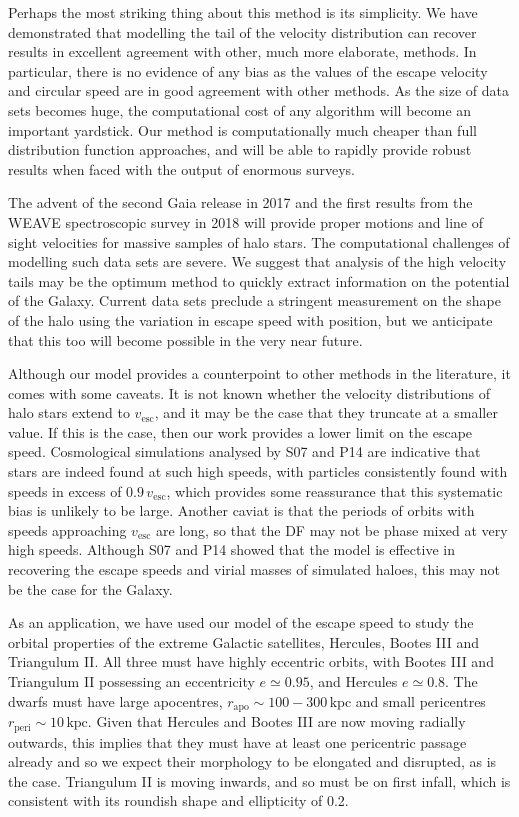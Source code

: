 \documentclass[useAMS,twocolumn,usenatbib]{mn2e}
\def\kpc{{\,\mathrm{kpc}}}
\def\vesc{{v_\mathrm{esc}}}
\def\rp{{r_\mathrm{peri}}}
\def\ra{{r_\mathrm{apo}}}
\begin{document}
Perhaps the most striking thing about this method is its simplicity. 
We have demonstrated that modelling the tail of the velocity distribution can recover results in excellent agreement with other, much more elaborate, methods. 
In particular, there is no evidence of any bias as the values of the escape velocity and circular speed are in good agreement with other methods.  
As the size of data sets becomes huge, the computational cost of any algorithm will become an important yardstick. 
Our method is computationally much cheaper than full distribution function approaches, and will be able to rapidly provide robust results when faced with the output of enormous surveys.

The advent of the second Gaia release in 2017 and the first results from the WEAVE spectroscopic survey in 2018 will provide proper motions and line of sight velocities for massive samples of halo stars. 
The computational challenges of modelling such data sets are severe. 
We suggest that analysis of the high velocity tails may be the optimum method to quickly extract information on the potential of the Galaxy.  
Current data sets preclude a stringent measurement on the shape of the halo using the variation in escape speed with position, but we anticipate that this too will become possible in the very near future.

Although our model provides a counterpoint to other methods in the literature, it comes with some caveats.
It is not known whether the velocity distributions of halo stars extend to $\vesc$, and it may be the case that they truncate at a smaller value.
If this is the case, then our work provides a lower limit on the escape speed.
Cosmological simulations analysed by S07 and P14 are indicative that stars are indeed found at such high speeds, with particles consistently found with speeds in excess of $0.9\,\vesc$, which provides some reassurance that this systematic bias is unlikely to be large.
Another caviat is that the periods of orbits with speeds approaching $\vesc$ are long, so that the DF may not be phase mixed at very high speeds. 
Although S07 and P14 showed that the model is effective in recovering the escape speeds and virial masses of simulated haloes, this may not be the case for the Galaxy.  

As an application, we have used our model of the escape speed to study the orbital properties of the extreme Galactic satellites, Hercules, Bootes III and Triangulum II. 
All three must have highly eccentric orbits, with Bootes III and Triangulum II possessing an eccentricity $e \simeq 0.95$, and Hercules
$e \simeq 0.8$. 
The dwarfs must have large apocentres, $\ra \sim 100 - 300\kpc$ and small pericentres $\rp \sim 10\kpc$. 
Given that Hercules and Bootes III are now moving radially outwards, this implies that they must have at least one pericentric passage already and so we expect their morphology to be elongated and disrupted, as is the case. 
Triangulum II is moving inwards, and so must be on first infall, which is consistent with its roundish shape and ellipticity of 0.2.
\end{document}
